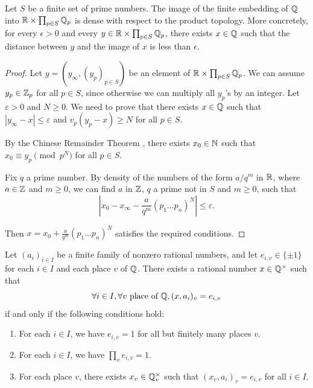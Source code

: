 \begin{theorem}\label{thm:approximation}%
	\leanok
	Let $S$ be a finite set of prime numbers.
	The image of the finite embedding of $\mathbb{Q}$ into $\mathbb{R} \times \prod_{p \in S} \mathbb{Q}_p$ is dense with respect to
	the product topology. More concretely, for every $\epsilon > 0$ and every
	$y \in \mathbb{R} \times \prod_{p \in S} \mathbb{Q}_p$, there exists $x \in \mathbb{Q}$ such that the distance
	between $y$ and the image of $x$ is less than $\epsilon$.
\end{theorem}
\begin{proof}
	Let $y=(y_\infty, (y_p)_{p \in S})$ be an element of $\mathbb{R} \times \prod_{p \in S} \mathbb{Q}_p$.
	We can assume $y_p \in \mathbb{Z}_p$ for all $p \in S$, since otherwise we can multiply all $y_p$'s by an
	integer. Let $\varepsilon > 0$ and $N \ge 0$. We need to prove that there exists $x \in \mathbb{Q}$ such that
	$|y_\infty - x| \le \varepsilon$ and $v_p(y_p - x) \ge N$ for all $p \in S$.

	By the Chinese Remainder Theorem , there exists $x_0 \in \mathbb{N}$
	such that $x_0 \equiv y_p \pmod{p^N}$ for all $p \in S$.

	Fix $q$ a prime number. By density of the numbers of the form $a/q^m$ in $\mathbb{R}$, where $a \in \mathbb{Z}$
	and $m \ge 0$, we can find $a$ in $\mathbb{Z}$, $q$ a prime not in $S$ and $m \ge 0$, such that
	\[
	|x_0 - x_\infty - \frac{a}{q^m}(p_1\dots p_n)^N| \le \varepsilon.
	\]

	Then $x = x_0 + \frac{a}{q^m}(p_1\dots p_n)^N$ satisfies the required conditions.
\end{proof}


\begin{theorem}\label{thm:existence}
	\leanok
	Let $(a_i)_{i \in I}$ be a finite family of nonzero rational numbers, and let
	$e_{i,v} \in \{\pm 1\}$ for each $i \in I$ and each place $v$ of $\mathbb{Q}$. There exists a rational
	number $x \in \mathbb{Q}^\times$ such that
	\[
	\forall i \in I, \forall v \text{ place of } \mathbb{Q}, (x,a_i)_v=e_{i,v}
	\]
	if and only if the following conditions hold:
	\begin{enumerate}
		\item For each $i \in I$, we have $e_{i,v}=1$ for all but finitely many places $v$.
		\item For each $i \in I$, we have $\prod_v e_{i,v}=1$.
		\item For each place $v$, there exists $x_v \in \mathbb{Q}_v^\times$ such that
		$(x_v, a_i)_v = e_{i,v}$ for all $i \in I$.
	\end{enumerate}
\end{theorem}

